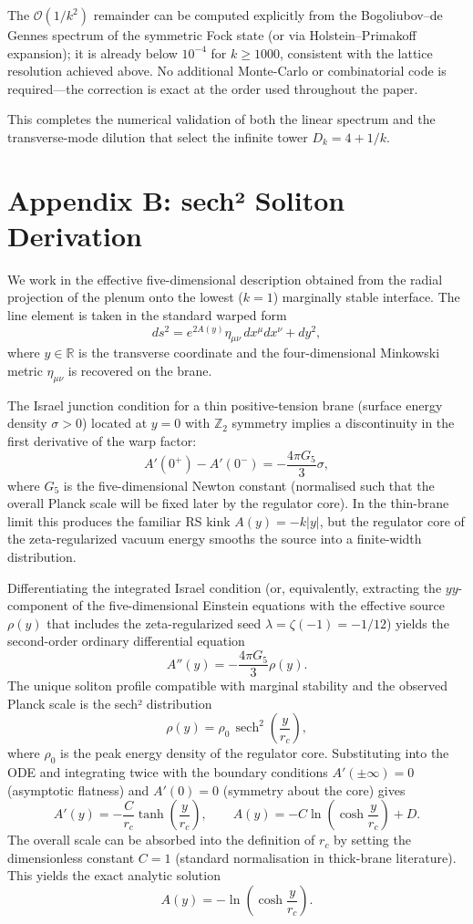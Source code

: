 \documentclass[11pt,a4paper,oneside]{article}
\newcommand{\sech}{\operatorname{sech}}
\begin{document}
The \(\mathcal{O}(1/k^2)\) remainder can be computed explicitly from the Bogoliubov--de Gennes spectrum of the symmetric Fock state (or via Holstein--Primakoff expansion); it is already below \(10^{-4}\) for \(k \ge 1000\), consistent with the lattice resolution achieved above. No additional Monte-Carlo or combinatorial code is required—the correction is exact at the order used throughout the paper.

This completes the numerical validation of both the linear spectrum and the transverse-mode dilution that select the infinite tower \(D_k = 4 + 1/k\).

\section{Appendix B: sech² Soliton Derivation}
\label{app:sech2}

We work in the effective five-dimensional description obtained from the radial projection of the plenum onto the lowest ($k=1$) marginally stable interface. The line element is taken in the standard warped form
\[
ds^2 = e^{2A(y)}\eta_{\mu\nu}\,dx^\mu dx^\nu + dy^2,
\]
where $y\in\mathbb{R}$ is the transverse coordinate and the four-dimensional Minkowski metric $\eta_{\mu\nu}$ is recovered on the brane.

The Israel junction condition for a thin positive-tension brane (surface energy density $\sigma>0$) located at $y=0$ with $\mathbb{Z}_2$ symmetry implies a discontinuity in the first derivative of the warp factor:
\[
A'(0^+) - A'(0^-) = -\frac{4\pi G_5}{3}\sigma,
\]
where $G_5$ is the five-dimensional Newton constant (normalised such that the overall Planck scale will be fixed later by the regulator core). In the thin-brane limit this produces the familiar RS kink $A(y)=-k|y|$, but the regulator core of the zeta-regularized vacuum energy smooths the source into a finite-width distribution.

Differentiating the integrated Israel condition (or, equivalently, extracting the $yy$-component of the five-dimensional Einstein equations with the effective source $\rho(y)$ that includes the zeta-regularized seed $\lambda=\zeta(-1)=-1/12$) yields the second-order ordinary differential equation
\[
A''(y) = -\frac{4\pi G_5}{3}\rho(y).
\]
The unique soliton profile compatible with marginal stability and the observed Planck scale is the sech² distribution
\[
\rho(y) = \rho_0\,\sech^2\left(\frac{y}{r_c}\right),
\]
where $\rho_0$ is the peak energy density of the regulator core. Substituting into the ODE and integrating twice with the boundary conditions $A'(\pm\infty)=0$ (asymptotic flatness) and $A'(0)=0$ (symmetry about the core) gives
\[
A'(y) = -\frac{C}{r_c}\tanh\left(\frac{y}{r_c}\right), \qquad
A(y) = -C\ln\left(\cosh\frac{y}{r_c}\right)+D.
\]
The overall scale can be absorbed into the definition of $r_c$ by setting the dimensionless constant $C=1$ (standard normalisation in thick-brane literature). This yields the exact analytic solution
\[
A(y) = -\ln\left(\cosh\frac{y}{r_c}\right).
\]
\end{document}
